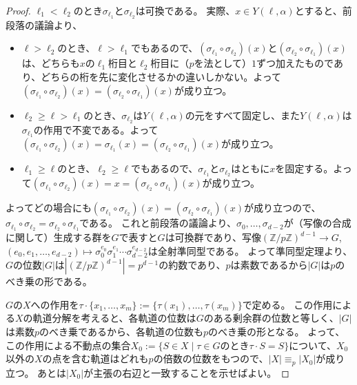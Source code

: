 ﻿\documentclass{ltjsarticle}
\theoremstyle{definition}
\begin{document}
\begin{proof}
    $\ell_1 < \ell_2$のとき$\sigma_{\ell_1}$と$\sigma_{\ell_2}$は可換である。
    実際、$x \in Y(\ell,\alpha)$とすると、前段落の議論より、
    \begin{itemize}
        \item $\ell > \ell_2$のとき、$\ell > \ell_1$でもあるので、$(\sigma_{\ell_1} \circ \sigma_{\ell_2})(x)$と$(\sigma_{\ell_2} \circ \sigma_{\ell_1})(x)$は、どちらも$x$の$\ell_1$桁目と$\ell_2$桁目に（$p$を法として）$1$ずつ加えたものであり、どちらの桁を先に変化させるかの違いしかない。よって$(\sigma_{\ell_1} \circ \sigma_{\ell_2})(x) = (\sigma_{\ell_2} \circ \sigma_{\ell_1})(x)$が成り立つ。
        \item $\ell_2 \geq \ell > \ell_1$のとき、$\sigma_{\ell_2}$は$Y(\ell,\alpha)$の元をすべて固定し、また$Y(\ell,\alpha)$は$\sigma_{\ell_1}$の作用で不変である。よって$(\sigma_{\ell_1} \circ \sigma_{\ell_2})(x) = \sigma_{\ell_1}(x) = (\sigma_{\ell_2} \circ \sigma_{\ell_1})(x)$が成り立つ。
        \item $\ell_1 \geq \ell$のとき、$\ell_2 \geq \ell$でもあるので、$\sigma_{\ell_1}$と$\sigma_{\ell_2}$はともに$x$を固定する。よって$(\sigma_{\ell_1} \circ \sigma_{\ell_2})(x) = x = (\sigma_{\ell_2} \circ \sigma_{\ell_1})(x)$が成り立つ。
    \end{itemize}
    よってどの場合にも$(\sigma_{\ell_1} \circ \sigma_{\ell_2})(x) = (\sigma_{\ell_2} \circ \sigma_{\ell_1})(x)$が成り立つので、$\sigma_{\ell_1} \circ \sigma_{\ell_2} = \sigma_{\ell_2} \circ \sigma_{\ell_1}$である。
    これと前段落の議論より、$\sigma_0,\dots,\sigma_{d-2}$が（写像の合成に関して）生成する群を$G$で表すと$G$は可換群であり、写像$(\mathbb{Z}/p\mathbb{Z})^{d-1} \to G$, $(e_0,e_1,\dots,e_{d-2}) \mapsto \sigma_0^{e_0} \sigma_1^{e_1} \cdots \sigma_{d-2}^{e_{d-2}}$は全射準同型である。
    よって準同型定理より、$G$の位数$|G|$は$|(\mathbb{Z}/p\mathbb{Z})^{d-1}| = p^{d-1}$の約数であり、$p$は素数であるから$|G|$は$p$のべき乗の形である。

    $G$の$X$への作用を$\tau \cdot \{x_1,\dots,x_m\} := \{\tau(x_1),\dots,\tau(x_m)\}$で定める。
    この作用による$X$の軌道分解を考えると、各軌道の位数は$G$のある剰余群の位数と等しく、$|G|$は素数$p$のべき乗であるから、各軌道の位数も$p$のべき乗の形となる。
    よって、この作用による不動点の集合$X_0 := \{ S \in X \mid \mbox{$\tau \in G$のとき$\tau \cdot S = S$} \}$について、$X_0$以外の$X$の点を含む軌道はどれも$p$の倍数の位数をもつので、$|X| \equiv_p |X_0|$が成り立つ。
    あとは$|X_0|$が主張の右辺と一致することを示せばよい。


\end{proof}
\end{document}
